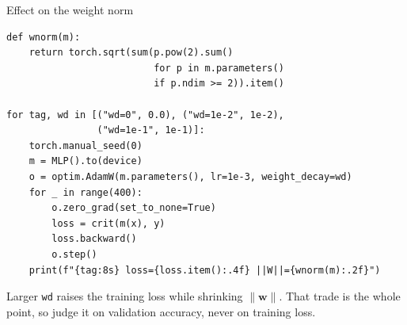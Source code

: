 \documentclass[10pt,aspectratio=169]{beamer}
\begin{document}
\begin{frame}[fragile]{Effect on the weight norm}
\begin{lstlisting}[basicstyle=\ttfamily\scriptsize]
def wnorm(m):
    return torch.sqrt(sum(p.pow(2).sum()
                          for p in m.parameters()
                          if p.ndim >= 2)).item()

for tag, wd in [("wd=0", 0.0), ("wd=1e-2", 1e-2),
                ("wd=1e-1", 1e-1)]:
    torch.manual_seed(0)
    m = MLP().to(device)
    o = optim.AdamW(m.parameters(), lr=1e-3, weight_decay=wd)
    for _ in range(400):
        o.zero_grad(set_to_none=True)
        loss = crit(m(x), y)
        loss.backward()
        o.step()
    print(f"{tag:8s} loss={loss.item():.4f} ||W||={wnorm(m):.2f}")
\end{lstlisting}
Larger \texttt{wd} raises the training loss while shrinking $\lVert\mathbf{w}\rVert$. That trade is the
whole point, so judge it on validation accuracy, never on training loss.
\end{frame}

\end{document}
